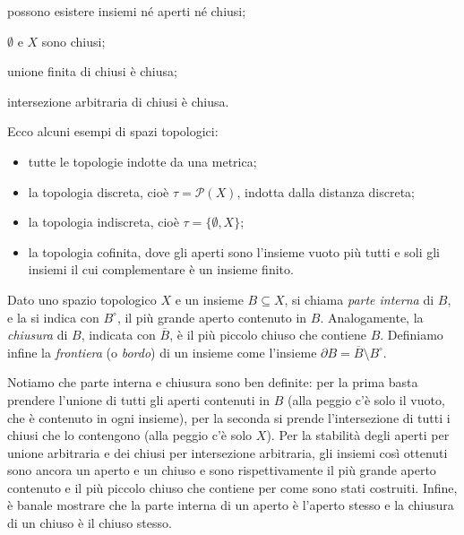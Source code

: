 \documentclass{article}
\begin{document}
\begin{oss}
\begin{nlist}
\item possono esistere insiemi né aperti né chiusi;
\item $\emptyset$ e $X$ sono chiusi;
\item unione finita di chiusi è chiusa;
\item intersezione arbitraria di chiusi è chiusa.
\end{nlist}
\end{oss}

\begin{ex}
Ecco alcuni esempi di spazi topologici:
\begin{itemize}
\item tutte le topologie indotte da una metrica;
\item la topologia discreta, cioè $\tau=\mathcal{P}(X)$, indotta dalla distanza
discreta;
\item la topologia indiscreta, cioè $\tau=\{ \emptyset, X \}$;
\item la topologia cofinita, dove gli aperti sono l'insieme vuoto più tutti e
soli gli insiemi il cui complementare è un insieme finito.
\end{itemize}
\end{ex}

\begin{defn}
	Dato uno spazio topologico $X$ e un insieme $B \subseteq X$, si chiama \textit{parte interna} di $B$, e la si indica con $B^{\circ}$, il più grande aperto contenuto in $B$. Analogamente, la \textit{chiusura} di $B$, indicata con $\overline{B}$, è il più piccolo chiuso che contiene $B$. Definiamo infine la \textit{frontiera} (o \textit{bordo}) di un insieme come l'insieme $\partial B= \overline{B} \setminus B^{\circ}$.
\end{defn}

Notiamo che parte interna e chiusura sono ben definite: per la prima basta prendere l'unione di tutti gli aperti contenuti in $B$ (alla peggio c'è solo il vuoto, che è contenuto in ogni insieme), per la seconda si prende l'intersezione di tutti i chiusi che lo contengono (alla peggio c'è solo $X$). Per la stabilità degli aperti per unione arbitraria e dei chiusi per intersezione arbitraria, gli insiemi così ottenuti sono ancora un aperto e un chiuso e sono rispettivamente il più grande aperto contenuto e il più piccolo chiuso che contiene per come sono stati costruiti. Infine, è banale mostrare che la parte interna di un aperto è l'aperto stesso e la chiusura di un chiuso è il chiuso stesso.
\end{document}
